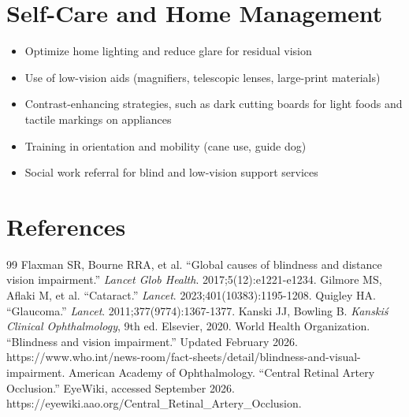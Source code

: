 \section*{Self-Care and Home Management}
\begin{itemize}
 \item Optimize home lighting and reduce glare for residual vision
 \item Use of low-vision aids (magnifiers, telescopic lenses, large-print materials)
 \item Contrast-enhancing strategies, such as dark cutting boards for light foods and tactile markings on appliances
 \item Training in orientation and mobility (cane use, guide dog)
 \item Social work referral for blind and low-vision support services
\end{itemize}

\section*{References}
\begin{thebibliography}{99}
 Flaxman SR, Bourne RRA, et al. ``Global causes of blindness and distance vision impairment.'' \textit{Lancet Glob Health}. 2017;5(12):e1221-e1234.
 Gilmore MS, Aflaki M, et al. ``Cataract.'' \textit{Lancet}. 2023;401(10383):1195-1208.
 Quigley HA. ``Glaucoma.'' \textit{Lancet}. 2011;377(9774):1367-1377.
 Kanski JJ, Bowling B. \textit{Kanski\'s Clinical Ophthalmology}, 9th ed. Elsevier, 2020.
 World Health Organization. ``Blindness and vision impairment.'' Updated February 2026. https://www.who.int/news-room/fact-sheets/detail/blindness-and-visual-impairment.
 American Academy of Ophthalmology. ``Central Retinal Artery Occlusion.'' EyeWiki, accessed September 2026. https://eyewiki.aao.org/Central\_Retinal\_Artery\_Occlusion.
\end{thebibliography}
